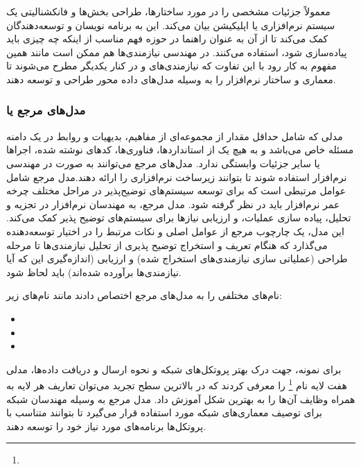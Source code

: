 معمولاً جزئیات مشخصی را در مورد ساختار‌ها، طراحی بخش‌ها و فانکشنالیتی یک سیستم
نرم‌افزاری یا اپلیکیشن بیان می‌کند. این  به برنامه نویسان و
توسعه‌دهندگان کمک می‌کند تا از آن به عنوان راهنما در حوزه فهم مناسب از اینکه چه
چیزی باید پیاده‌سازی شود، استفاده می‌کنند. در مهندسی نیازمندی‌ها هم ممکن است
مانند همین مفهوم به کار رود با این تفاوت که نیازمندی‌های  و
 در کنار یکدیگر مطرح می‌شوند تا معماری و ساختار نرم‌افزار را
به وسیله مدل‌های داده محور طراحی و توسعه دهند.

\subsubsection{مد‌ل‌های مرجع یا }

مدلی که شامل حداقل مقدار از مجموعه‌ای از مفاهیم، بدیهیات و روابط در یک دامنه
مسئله خاص می‌باشد و به هیچ یک از استاندارد‌ها، فناوری‌ها، کد‌های نوشته شده،
اجراها یا سایر جزئیات وابستگی ندارد. مدل‌های مرجع می‌توانند به صورت
 در مهندسی نرم‌افزار استفاده شوند تا بتوانند زیرساخت نرم‌افزاری را
ارائه دهند.مدل مرجع شامل عوامل مرتبطی است که برای توسعه سیستم‌های توضیح‌پذیر در
مراحل مختلف چرخه عمر نرم‌افزار باید در نظر گرفته شود. مدل مرجع، به مهندسان
نرم‌افزار در تجزیه و تحلیل، پیاده سازی عملیات، و ارزیابی نیازها برای سیستم‌های
توضیح پذیر کمک می‌کند. این مدل، یک چارچوب مرجع از عوامل اصلی و نکات مرتبط را در
اختیار توسعه‌دهنده می‌گذارد که هنگام تعریف و استخراج توضیح پذیری از تحلیل
نیازمندی‌ها تا مرحله طراحی (عملیاتی سازی نیازمندی‌های استخراج شده) و ارزیابی
(اندازه‌گیری این که آیا نیازمندی‌ها برآورده شده‌اند) باید لحاظ شود. 

نام‌های مختلفی را به مدل‌های مرجع اختصاص دادند مانند نام‌های زیر:

\begin{itemize}
    \item {}
    \item {}
    \item {}
\end{itemize}

برای نمونه، جهت درک بهتر پروتکل‌های شبکه و نحوه ارسال و دریافت داده‌ها، مدلی هفت
لایه نام \footnote{}  را معرفی کردند که
در بالاترین‌ سطح تجرید می‌توان تعاریف هر لایه به همراه وظایف آن‌ها را به بهترین
شکل آموزش داد. مدل مرجع  به وسیله مهندسان شبکه برای توصیف معماری‌های
شبکه مورد استفاده قرار می‌گیرد تا بتوانند متناسب با پروتکل‌ها برنامه‌های مورد
نیاز خود را توسعه دهند.

